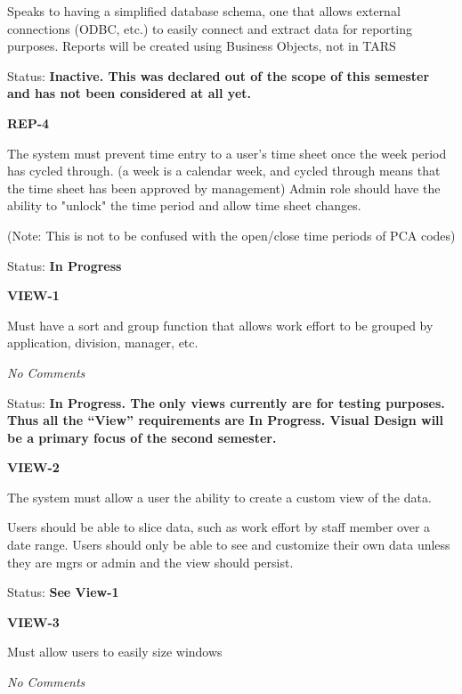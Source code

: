 \documentclass{article}
\begin{document}
\noindent Speaks to having a simplified database schema, one that allows external connections (ODBC, etc.) to easily connect and extract data for reporting purposes. Reports will be created using Business Objects, not in TARS

\noindent Status: \textbf{Inactive.   This was declared out of the scope of this semester and has not been considered at all yet.}

\noindent \textit{}


\noindent \textbf{REP-4}

\noindent The system must prevent time entry to a user's time sheet once the week period has cycled through. (a week is a calendar week, and cycled through means that the time sheet has been approved by management)  Admin role should have the ability to "unlock" the time period and allow time sheet changes.
	
\noindent(Note: This is not to be confused with the open/close time periods of PCA codes)

\noindent Status: \textbf{In Progress}\

\noindent \textit{}


\noindent \textbf{VIEW-1}

\noindent Must have a sort and group function that allows work effort to be grouped by application, division, manager, etc.

 \textit{No Comments}

\noindent Status: \textbf{In Progress.  The only views currently are for testing purposes.  Thus all the ``View'' requirements are In Progress.  Visual Design will be a primary focus of the second semester.}\textit{ }

\noindent \textit{}


\noindent \textbf{VIEW-2}

\noindent The system must allow a user the ability to create a custom view of the data.

\noindent Users should be able to slice data, such as work effort by staff member over a date range. Users should only be able to see and customize their own data unless they are mgrs or admin and the view should persist.

Status: \textbf{See View-1}

\noindent \textit{}


\noindent \textbf{VIEW-3}

\noindent Must allow users to easily size windows

 \textit{No Comments}
\end{document}
